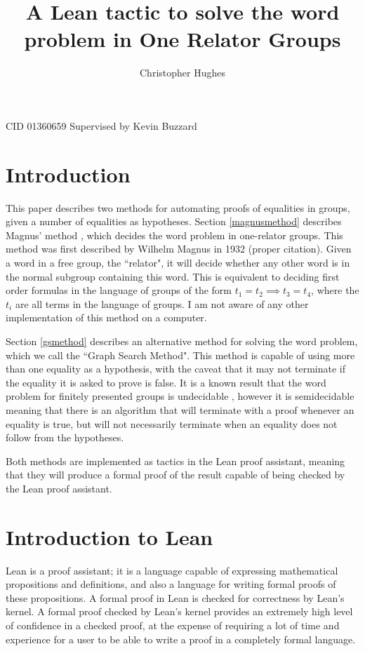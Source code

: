 \documentclass[12pt]{article} %
\title{A Lean tactic to solve the word problem in One Relator Groups}
\author{Christopher Hughes}
\theoremstyle{definition}
\theoremstyle{definition}
\theoremstyle{definition}
\theoremstyle{definition}
\theoremstyle{definition}
\theoremstyle{definition}
\begin{document}
\maketitle
CID 01360659 \newline
Supervised by Kevin Buzzard
\pagebreak
\tableofcontents
\pagebreak

\section{Introduction}

This paper describes two methods for automating proofs of equalities in groups, given
a number of equalities as hypotheses. Section \ref{magnusmethod} describes Magnus' method
\cite{mccool_schupp_1973}, which decides the word problem in one-relator groups.
This method was first described by Wilhelm Magnus in 1932 (proper citation). Given a word in
a free group, the ``relator", it will decide whether any other word is in the
normal subgroup containing this word. This is equivalent to deciding first order
formulas in the language of groups of the form $t_1 = t_2 \implies t_3 = t_4$,
where the $t_i$ are all terms in the language of groups.
I am not aware of any other implementation of this method on a computer.

Section \ref{gsmethod} describes an alternative method for solving the word problem,
which we call the ``Graph Search Method".
This method is capable of using more than one equality as a hypothesis,
with the caveat that it may not terminate if the equality it is asked to prove is false.
It is a known result that the word problem for finitely presented groups is undecidable
\cite{collins1986}, however it is semidecidable meaning that  there is an algorithm
that will terminate with a proof whenever an equality is true, but will not necessarily
terminate when an equality does not follow from the hypotheses.

Both methods are implemented as tactics in the Lean proof assistant, meaning that
they will produce a formal proof of the result capable of being checked by the Lean
proof assistant.

\section{Introduction to Lean}

Lean \cite{de_moura_kong_avigad_van_doorn_von_raumer_2018} is a proof assistant;
it is a language capable of expressing mathematical propositions
and definitions, and also a language for writing formal proofs of these propositions.
A formal proof in Lean is checked for correctness by Lean's kernel.
A formal proof checked by Lean's kernel provides
an extremely high level of confidence in a checked proof, at the expense of requiring a lot
of time and experience for a user to be able to write a proof in a completely formal language.
\end{document}
